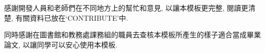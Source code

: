 \StartAcknowledgmentsChi

感謝開發人員和老師們在不同地方上的幫忙和意見, 以讓本模板更完整, 閱讀更清楚, 有關資料已放在`CONTRIBUTE'中.

同時感謝在圖書館和教務處課務組的職員去查核本模板所產生的樣子適合當成畢業論文, 以讓同學可以安心使用本模板.

\EndAcknowledgments
